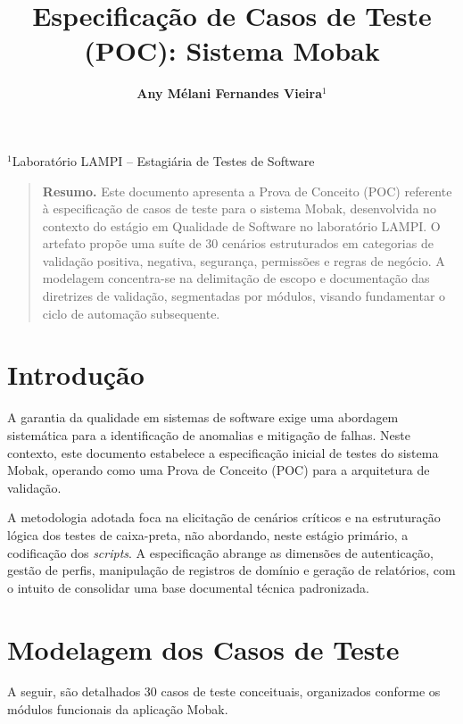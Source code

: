 \documentclass[12pt,a4paper]{article}
\title{\vspace{-2cm}\textbf{\Large Especificação de Casos de Teste (POC): Sistema Mobak}}
\author{\textbf{Any Mélani Fernandes Vieira$^1$}}
\date{}
\begin{document}
\maketitle
\vspace{-1.5cm}
\begin{center}
$^1$Laboratório LAMPI -- Estagiária de Testes de Software
\end{center}
\vspace{0.5cm}
\begin{quote}
\small
\textbf{Resumo.} Este documento apresenta a Prova de Conceito (POC) referente à especificação de casos de teste para o sistema Mobak, desenvolvida no contexto do estágio em Qualidade de Software no laboratório LAMPI. O artefato propõe uma suíte de 30 cenários estruturados em categorias de validação positiva, negativa, segurança, permissões e regras de negócio. A modelagem concentra-se na delimitação de escopo e documentação das diretrizes de validação, segmentadas por módulos, visando fundamentar o ciclo de automação subsequente.
\end{quote}

\section{Introdução}
A garantia da qualidade em sistemas de software exige uma abordagem sistemática para a identificação de anomalias e mitigação de falhas. Neste contexto, este documento estabelece a especificação inicial de testes do sistema Mobak, operando como uma Prova de Conceito (POC) para a arquitetura de validação.

A metodologia adotada foca na elicitação de cenários críticos e na estruturação lógica dos testes de caixa-preta, não abordando, neste estágio primário, a codificação dos \textit{scripts}. A especificação abrange as dimensões de autenticação, gestão de perfis, manipulação de registros de domínio e geração de relatórios, com o intuito de consolidar uma base documental técnica padronizada.

\section{Modelagem dos Casos de Teste}
A seguir, são detalhados 30 casos de teste conceituais, organizados conforme os módulos funcionais da aplicação Mobak.
\end{document}
